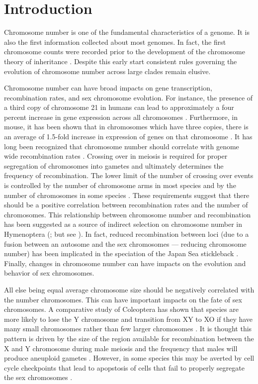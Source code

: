 \section{Introduction}
Chromosome number is one of the fundamental characteristics of a genome.
It is also the first information collected about most genomes. 
In fact, the first chromosome counts were recorded prior to the development of the chromosome theory of inheritance \citep{flemming1882}.
Despite this early start consistent rules governing the evolution of chromosome number across large clades remain elusive. 

Chromosome number can have broad impacts on gene transcription, recombination rates, and sex chromosome evolution. 
For instance, the presence of a third copy of chromosome 21 in humans can lead to approximately a four percent increase in gene expression across all chromosomes \citep{lockstone2007}.
Furthermore, in mouse, it has been shown that in chromosomes which have three copies, there is an average of 1.5-fold increase in expression of genes on that chromosome \citep{williams2008aneuploidy}. 
It has long been recognized that chromosome number should correlate with genome wide recombination rates \citep{stebbins1958}.
Crossing over in meiosis is required for proper segregation of chromosomes into gametes and ultimately determines the frequency of recombination.
The lower limit of the number of crossing over events is controlled by the number of chromosome arms in most species and by the number of chromosomes in some species \citep{dumont2017req}.
These requirements suggest that there should be a positive correlation between recombination rates and the number of chromosomes. 
This relationship between chromosome number and recombination has been suggested as a source of indirect selection on chromosome number in Hymenoptera (\citealt{sherman1979}; but see \citealt{ross2015}).
In fact, reduced recombination between loci (due to a fusion between an autosome and the sex chromosomes --- reducing chromosome number) has been implicated in the speciation of the Japan Sea stickleback \citep{kitano2012}. 
Finally, changes in chromosome number can have impacts on the evolution and behavior of sex chromosomes. 

All else being equal average chromosome size should be negatively correlated with the number chromosomes.
This can have important impacts on the fate of sex chromosomes.
A comparative study of Coleoptera has shown that species are more likely to lose the Y chromosome and transition from XY to XO if they have many small chromosomes rather than few larger chromosomes \citep{blackmon2015bioessay}.
It is thought this pattern is driven by the size of the region available for recombination between the X and Y chromosome during male meiosis and the frequency that males will produce aneuploid gametes \citep{blackmon2014}.
However, in some species this may be averted by cell cycle checkpoints that lead to apopstosis of cells that fail to properly segregate the sex chromosomes \citep{dumont2017par}.

